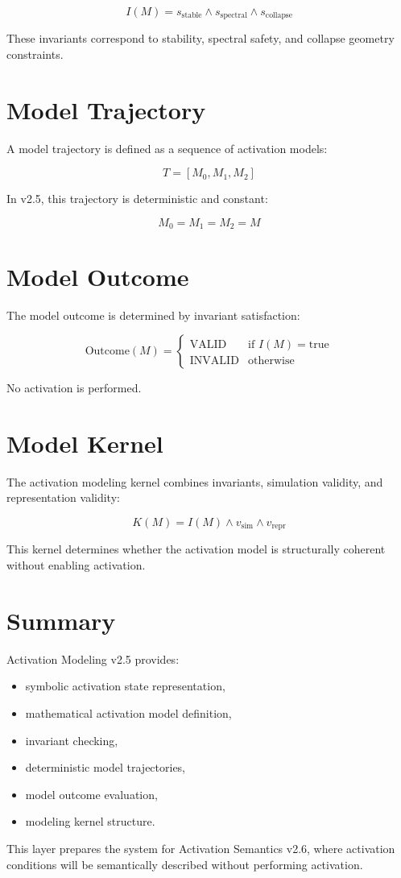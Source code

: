 \documentclass[11pt]{article}
\begin{document}
\[
I(M) = s_{\text{stable}} \land s_{\text{spectral}} \land s_{\text{collapse}}
\]

These invariants correspond to stability, spectral safety, and collapse
geometry constraints.

\section*{Model Trajectory}

A model trajectory is defined as a sequence of activation models:

\[
T = [M_0, M_1, M_2]
\]

In v2.5, this trajectory is deterministic and constant:

\[
M_0 = M_1 = M_2 = M
\]

\section*{Model Outcome}

The model outcome is determined by invariant satisfaction:

\[
\text{Outcome}(M) =
\begin{cases}
\text{VALID} & \text{if } I(M) = \text{true} \\
\text{INVALID} & \text{otherwise}
\end{cases}
\]

No activation is performed.

\section*{Model Kernel}

The activation modeling kernel combines invariants, simulation validity, and
representation validity:

\[
K(M) = I(M) \land v_{\text{sim}} \land v_{\text{repr}}
\]

This kernel determines whether the activation model is structurally coherent
without enabling activation.

\section*{Summary}

Activation Modeling v2.5 provides:

\begin{itemize}
\item symbolic activation state representation,
\item mathematical activation model definition,
\item invariant checking,
\item deterministic model trajectories,
\item model outcome evaluation,
\item modeling kernel structure.
\end{itemize}

This layer prepares the system for Activation Semantics v2.6, where activation
conditions will be semantically described without performing activation.
\end{document}
